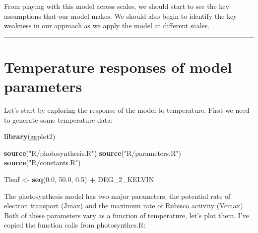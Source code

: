 \documentclass[]{article}
\newenvironment{Shaded}{\begin{snugshade}}{\end{snugshade}}
\newcommand{\DecValTok}[1]{\textcolor[rgb]{0.00,0.00,0.81}{#1}}
\newcommand{\FloatTok}[1]{\textcolor[rgb]{0.00,0.00,0.81}{#1}}
\newcommand{\KeywordTok}[1]{\textcolor[rgb]{0.13,0.29,0.53}{\textbf{#1}}}
\newcommand{\NormalTok}[1]{#1}
\newcommand{\OperatorTok}[1]{\textcolor[rgb]{0.81,0.36,0.00}{\textbf{#1}}}
\newcommand{\StringTok}[1]{\textcolor[rgb]{0.31,0.60,0.02}{#1}}
\begin{document}
From playing with this model across scales, we should start to see the
key assumptions that our model makes. We should also begin to identify
the key weakness in our approach as we apply the model at different
scales.

\begin{center}\rule{0.5\linewidth}{\linethickness}\end{center}

\hypertarget{temperature-responses-of-model-parameters}{%
\section{Temperature responses of model
parameters}\label{temperature-responses-of-model-parameters}}

Let's start by exploring the response of the model to temperature. First
we need to generate some temperature data:

\begin{Shaded}
\begin{Highlighting}[]
\KeywordTok{library}\NormalTok{(ggplot2)}

\KeywordTok{source}\NormalTok{(}\StringTok{"R/photosynthesis.R"}\NormalTok{)}
\KeywordTok{source}\NormalTok{(}\StringTok{"R/parameters.R"}\NormalTok{)}
\KeywordTok{source}\NormalTok{(}\StringTok{"R/constants.R"}\NormalTok{)}

\NormalTok{Tleaf <-}\StringTok{ }\KeywordTok{seq}\NormalTok{(}\FloatTok{0.0}\NormalTok{, }\FloatTok{50.0}\NormalTok{, }\FloatTok{0.5}\NormalTok{) }\OperatorTok{+}\StringTok{ }\NormalTok{DEG_}\DecValTok{2}\NormalTok{_KELVIN}
\end{Highlighting}
\end{Shaded}

The photosynthesis model has two major parameters, the potential rate of
electron transport (Jmax) and the maximum rate of Rubisco activity
(Vcmax). Both of these parameters vary as a function of temperature,
let's plot them. I've copied the function calls from photosynthes.R:
\end{document}
